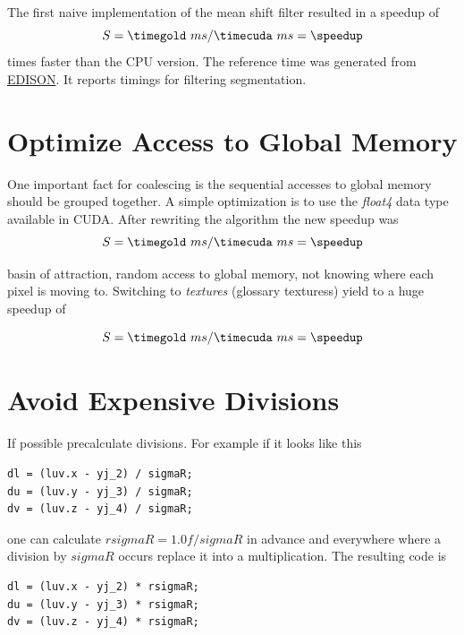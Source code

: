 The first naive implementation of the mean shift filter resulted in a speedup of
\begin{equation*}\label{eq:speedup0}
	S = \timegold\ ms/\timecuda\ ms= \speedup
\end{equation*}
times faster than the \gls{CPU} version. The reference time was
generated from
\href{http://www.caip.rutgers.edu/riul/research/code.html}{\gls{EDISON}}. It
reports timings for filtering segmentation.

\section*{Optimize Access to Global Memory}
\label{sec:coalescing}

One important fact for coalescing is the sequential accesses to global memory
should be grouped together. A simple optimization is to use the \emph{float4}
data type available in \gls{CUDA}. After rewriting the algorithm the new speedup
was 
\fpDiv{\speedup}{\timegold}{\timecuda}
\begin{equation*}\label{eq:speedup0}
	S = \timegold\ ms/\timecuda\ ms = \speedup
\end{equation*}

basin of attraction, random access to global memory, not knowing where each pixel
is moving to. Switching to \emph{textures} (glossary texturess) yield to a huge
speedup of 

\fpDiv{\speedup}{\timegold}{\timecuda}
\begin{equation*}\label{eq:speedup0}
	S = \timegold\ ms/\timecuda\ ms = \speedup
\end{equation*}


\section*{Avoid Expensive Divisions}
\label{sec:expensive_divisions}

If possible precalculate divisions. For example if it looks like this
\begin{lstlisting}[caption=Divison, label=lst:division]
dl = (luv.x - yj_2) / sigmaR;               
du = (luv.y - yj_3) / sigmaR;               
dv = (luv.z - yj_4) / sigmaR;
\end{lstlisting}
one can calculate $rsigmaR = 1.0f/sigmaR$ in advance and everywhere where a division by
$sigmaR$ occurs replace it into a multiplication. The resulting code is
\begin{lstlisting}[caption=Precalculated Divison, label=lst:precalcdivision]
dl = (luv.x - yj_2) * rsigmaR;               
du = (luv.y - yj_3) * rsigmaR;               
dv = (luv.z - yj_4) * rsigmaR;
\end{lstlisting}


